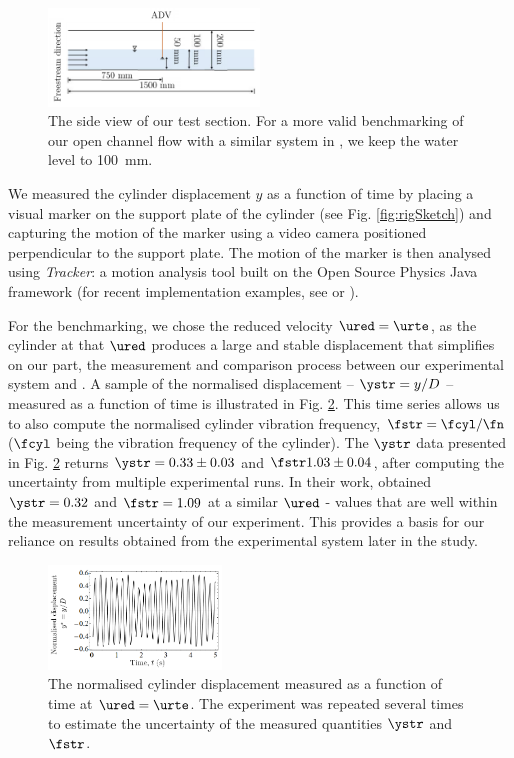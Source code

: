 \documentclass[a4paper,fleqn]{cas-sc}
\begin{document}
\begin{figure}
  \centering
  \includegraphics[width=0.5\textwidth]{figs/keyDimensions}
  \caption{The side view of our test section. For a more valid benchmarking of our open channel flow with a similar system in \citet{Koide2013}, we keep the water level to \SI{100}{\milli\metre}.}
  \label{fig:keyDimensions}
\end{figure}

We measured the cylinder displacement $y$ as a function of time by placing a visual marker on the support plate of the cylinder (see Fig. \ref{fig:rigSketch}) and capturing the motion of the marker using a video camera positioned perpendicular to the support plate. The motion of the marker is then analysed using \textit{Tracker}: a motion analysis tool built on the Open Source Physics Java framework (for recent implementation examples, see \citet{Wen2020}  or \citet{Krishnendu2020}).

For the benchmarking, we chose the reduced velocity $\ured = \urte$, as the cylinder at that $\ured$ produces a large and stable displacement that simplifies on our part, the measurement and comparison process between our experimental system and \citet{Koide2013}. A sample of the normalised displacement -- $\ystr = y/D$ -- measured as a function of time is illustrated in Fig. \ref{fig:sampTimeHist}. This time series allows us to also compute the normalised cylinder vibration frequency, $\fstr = \fcyl/\fn$ ($\fcyl$ being the vibration frequency of the cylinder). The $\ystr$ data presented in Fig. \ref{fig:sampTimeHist} returns $\ystr = 0.33 \pm 0.03$ and $\fstr 1.03 \pm 0.04$, after computing the uncertainty from multiple experimental runs. In their work, \citet{Koide2013} obtained $\ystr = 0.32$ and $\fstr = 1.09$ at a similar $\ured$ - values that are well within the measurement uncertainty of our experiment. This provides a basis for our reliance on results obtained from the experimental system later in the study.

\begin{figure}
  \centering
  \includegraphics[width=0.41\textwidth]{figs/figure5}
  \caption{The normalised cylinder displacement measured as a function of time at $\ured = \urte$. The experiment was repeated several times to estimate the uncertainty of the measured quantities $\ystr$ and $\fstr$.}
  \label{fig:sampTimeHist}
\end{figure}
\end{document}
